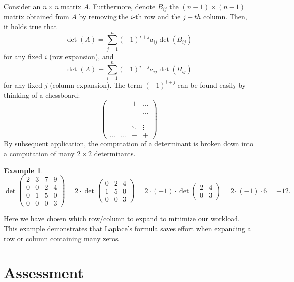 \documentclass[a4paper,11pt]{article}
\newtheorem{example}{Example}
\begin{document}
Consider an $n\times n$ matrix $A$. Furthermore, denote $B_{ij}$ the $(n-1)\times(n-1)$ matrix obtained from $A$ by removing the $i$-th row and the $j-th$ column. Then, it holds true that
\begin{equation}
\det(A) = \sum_{j=1}^{n} (-1)^{i+j} a_{ij} \det(B_{ij})
\end{equation}
for any fixed $i$ (row expansion), and
\begin{equation}
\det(A) = \sum_{i=1}^{n} (-1)^{i+j} a_{ij} \det(B_{ij}) 
\end{equation}
for any fixed $ j$ (column expansion).
The term $(-1)^{i+j}$ can be found easily by thinking of a chessboard: 
\begin{equation*}\begin{pmatrix}
+ & - & + & \hdots  \\
- & + & - & \hdots \\
+& - & &  \\
& &\ddots  & \vdots \\
\hdots & \hdots &- &+ 
\end{pmatrix}
\end{equation*}
By subsequent application, the computation of a determinant is broken down into a computation of many $2\times 2$ determinants. 
\begin{example}
\begin{equation*}
\det\begin{pmatrix}
2 & 3 & 7 & 9 \\
0 & 0 & 2 & 4 \\
0 & 1 & 5 & 0 \\
0 & 0 & 0 & 3 
\end{pmatrix}
= 2\cdot \det\begin{pmatrix}
0 & 2 & 4 \\ 1 & 5 & 0 \\0 & 0 & 3
\end{pmatrix} = 2\cdot (-1) \cdot \det\begin{pmatrix}
2 & 4 \\ 0 & 3
\end{pmatrix}=2\cdot (-1) \cdot6=-12.
\end{equation*}
\end{example}
Here we have chosen which row/column to expand to minimize our workload. This example demonstrates that Laplace's formula saves effort when expanding a row or column containing many zeros.

\section*{Assessment}
\end{document}
